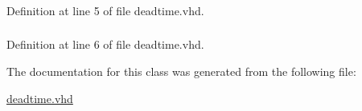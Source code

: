 \subsubsection[{std\+\_\+logic\+\_\+arith}]{\hspace{0.3cm}{\ttfamily [Package]}}\label{classdeadtime_a0f5ecc6613f63d07f7963a97b1b26095}


Definition at line 5 of file deadtime.\+vhd.

\hypertarget{classdeadtime_a598da929e807d58939b47499e8bc9fa8}{}
\subsubsection[{std\+\_\+logic\+\_\+unsigned}]{\hspace{0.3cm}{\ttfamily [Package]}}\label{classdeadtime_a598da929e807d58939b47499e8bc9fa8}


Definition at line 6 of file deadtime.\+vhd.



The documentation for this class was generated from the following file\+:\begin{DoxyCompactItemize}
\item 
\hyperlink{deadtime_8vhd}{deadtime.\+vhd}\end{DoxyCompactItemize}
